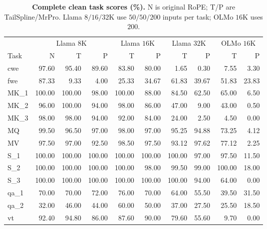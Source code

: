 \begin{table}[ht]
\centering\small\setlength{\tabcolsep}{3.5pt}
\caption{\textbf{Complete clean task scores (\%).} N is original RoPE; T/P are TailSpline/MrPro. Llama $8/16/32$K use $50/50/200$ inputs per task; OLMo $16$K uses $200$.}
\label{tab:compact-clean}\label{tab:clean-full13}
\begin{tabular}{@{}lrrrrrrrrr@{}}
\toprule
&\multicolumn{3}{c}{Llama $8$K}&\multicolumn{2}{c}{Llama $16$K}&\multicolumn{2}{c}{Llama $32$K}&\multicolumn{2}{c}{OLMo $16$K}\\
Task & N & T & P & T & P & T & P & T & P\\\midrule
cwe & 97.60 & 95.40 & 89.60 & 83.80 & 80.00 & 1.65 & 0.30 & 7.55 & 3.30 \\
fwe & 87.33 & 9.33 & 4.00 & 25.33 & 34.67 & 61.83 & 39.67 & 51.83 & 23.83 \\
MK\_1 & 100.00 & 100.00 & 98.00 & 100.00 & 88.00 & 84.50 & 62.50 & 65.00 & 6.50 \\
MK\_2 & 96.00 & 100.00 & 94.00 & 98.00 & 86.00 & 47.00 & 9.00 & 43.00 & 0.50 \\
MK\_3 & 98.00 & 98.00 & 94.00 & 92.00 & 84.00 & 24.00 & 2.50 & 4.50 & 0.00 \\
MQ & 99.50 & 96.50 & 97.00 & 98.00 & 97.00 & 95.25 & 94.88 & 73.25 & 4.12 \\
MV & 97.50 & 97.00 & 92.50 & 98.50 & 97.50 & 93.12 & 97.62 & 77.12 & 2.25 \\
S\_1 & 100.00 & 100.00 & 100.00 & 100.00 & 100.00 & 100.00 & 97.00 & 97.50 & 11.50 \\
S\_2 & 100.00 & 100.00 & 100.00 & 100.00 & 98.00 & 99.50 & 99.00 & 100.00 & 18.00 \\
S\_3 & 100.00 & 100.00 & 100.00 & 100.00 & 100.00 & 100.00 & 94.00 & 64.00 & 0.00 \\
qa\_1 & 70.00 & 70.00 & 72.00 & 76.00 & 70.00 & 64.00 & 55.50 & 39.50 & 31.50 \\
qa\_2 & 32.00 & 46.00 & 44.00 & 60.00 & 50.00 & 37.00 & 27.50 & 25.50 & 18.50 \\
vt & 92.40 & 94.80 & 86.00 & 87.60 & 90.00 & 79.60 & 55.60 & 9.70 & 0.00 \\
\bottomrule\end{tabular}\end{table}
